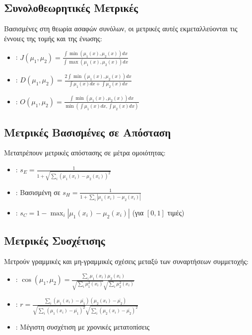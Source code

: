 \subsection{Συνολοθεωρητικές Μετρικές}
Βασισμένες στη θεωρία ασαφών συνόλων, οι μετρικές αυτές εκμεταλλεύονται τις έννοιες της τομής και της ένωσης:

\begin{itemize}
    \item \textbf{}: $J(\mu_1, \mu_2) = \frac{\int \min(\mu_1(x), \mu_2(x)) dx}{\int \max(\mu_1(x), \mu_2(x)) dx}$
    \item \textbf{}: $D(\mu_1, \mu_2) = \frac{2 \int \min(\mu_1(x), \mu_2(x)) dx}{\int \mu_1(x) dx + \int \mu_2(x) dx}$
    \item \textbf{}: $O(\mu_1, \mu_2) = \frac{\int \min(\mu_1(x), \mu_2(x)) dx}{\min(\int \mu_1(x) dx, \int \mu_2(x) dx)}$
\end{itemize}

\subsection{Μετρικές Βασισμένες σε Απόσταση}
Μετατρέπουν μετρικές απόστασης σε μέτρα ομοιότητας:

\begin{itemize}
    \item \textbf{}: $s_E = \frac{1}{1 + \sqrt{\sum_i (\mu_1(x_i) - \mu_2(x_i))^2}}$
    \item \textbf{}: Βασισμένη σε $s_H = \frac{1}{1 + \sum_i |\mu_1(x_i) - \mu_2(x_i)|}$
    \item \textbf{}: $s_C = 1 - \max_i |\mu_1(x_i) - \mu_2(x_i)|$ (για $[0,1]$ τιμές)
\end{itemize}

\subsection{Μετρικές Συσχέτισης}
Μετρούν γραμμικές και μη-γραμμικές σχέσεις μεταξύ των συναρτήσεων συμμετοχής:

\begin{itemize}
    \item \textbf{}: $\cos(\mu_1, \mu_2) = \frac{\sum_i \mu_1(x_i) \mu_2(x_i)}{\sqrt{\sum_i \mu_1^2(x_i)} \sqrt{\sum_i \mu_2^2(x_i)}}$
    \item \textbf{}: $r = \frac{\sum_i (\mu_1(x_i) - \bar{\mu_1})(\mu_2(x_i) - \bar{\mu_2})}{\sqrt{\sum_i (\mu_1(x_i) - \bar{\mu_1})^2} \sqrt{\sum_i (\mu_2(x_i) - \bar{\mu_2})^2}}$
    \item \textbf{}: Μέγιστη συσχέτιση με χρονικές μετατοπίσεις
\end{itemize}

